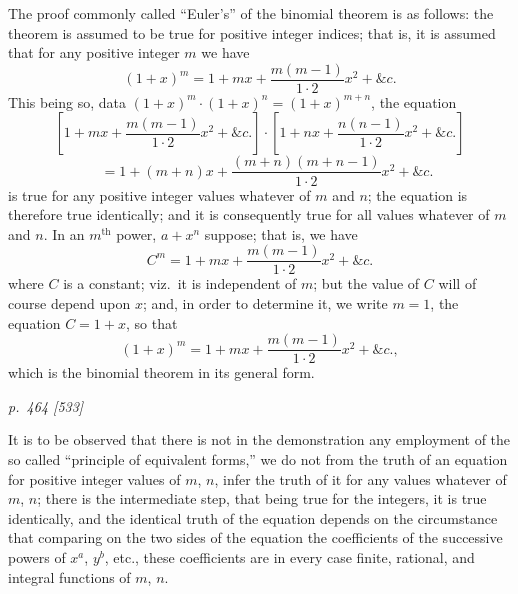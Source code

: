 \documentclass[11pt,a4paper]{book}
\begin{document}
The proof commonly called ``Euler's'' of the binomial theorem is as follows: the
theorem is assumed to be true for positive integer indices; that is, it is assumed that
for any positive integer $m$ we have
\[
(1 + x)^m = 1 + mx + \frac{m(m-1)}{1\cdot 2}x^2 + \&c.
\]
This being so, data $(1 + x)^m \cdot (1 + x)^n = (1 + x)^{m+n}$, the equation
\[
\left[1 + mx + \frac{m(m-1)}{1\cdot 2}x^2 + \&c.\right]\cdot\left[1 + nx + \frac{n(n-1)}{1\cdot 2}x^2 + \&c.\right]
\]
\[
\quad = 1 + (m + n)x + \frac{(m + n)(m + n - 1)}{1\cdot 2}x^2 + \&c.
\]
is true for any positive integer values whatever of $m$ and $n$; the equation is therefore
true identically; and it is consequently true for all values whatever of $m$ and $n$.
In an $m^{\text{th}}$ power, $a + x^{n}$ suppose; that is, we have
\[
C^m = 1 + mx + \frac{m(m-1)}{1\cdot 2}x^2 + \&c.
\]
where $C$ is a constant; viz.\ it is independent of $m$; but the value of $C$ will of course depend upon $x$; and, in order to determine it, we write $m = 1$, the equation $C = 1 + x$, so that
\[
(1 + x)^m = 1 + mx + \frac{m(m-1)}{1\cdot 2}x^2 + \&c.,
\]
which is the binomial theorem in its general form.

\clearpage

\bigskip
\textit{p.~464 [533]}
\smallskip

It is to be observed that there is not in the demonstration any employment of
the so called ``principle of equivalent forms,'' we do not from the truth of an equation
for positive integer values of $m$, $n$, infer the truth of it for any values whatever of
$m$, $n$; there is the intermediate step, that being true for the integers, it is true identically,
and the identical truth of the equation depends on the circumstance that comparing
on the two sides of the equation the coefficients of the successive powers of $x^a$, $y^b$, etc.,
these coefficients are in every case finite, rational, and integral functions of $m$, $n$.
\end{document}

